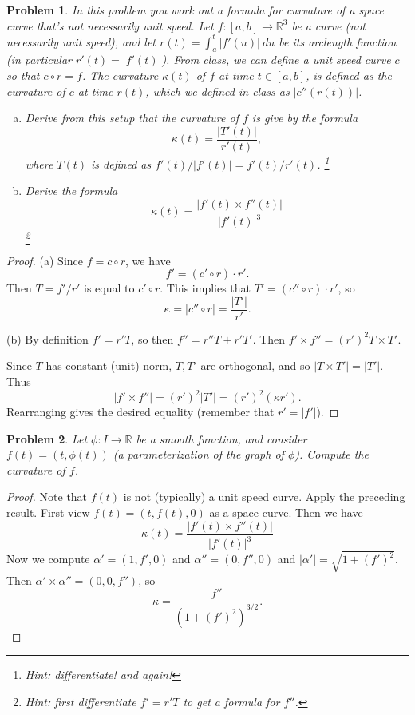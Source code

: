 \documentclass[11pt]{article}
\newtheorem{problem}{Problem}
\begin{document}
\pagebreak

\begin{problem}
In this problem you work out a formula for curvature of a space curve that's not necessarily unit speed. Let $f:[a,b]\to\mathbb R^3$ be a curve (not necessarily unit speed), and let $r(t)=\int_a^t|f'(u)|\>du$ be its arclength function (in particular $r'(t)=|f'(t)|$). From class, we can define a unit speed curve $c$ so that $c\circ r=f$. The curvature $\kappa(t)$ of $f$ at time $t\in[a,b]$, is defined as the curvature of $c$ at time $r(t)$, which we defined in class as $|c''(r(t))|$.  
\begin{enumerate}[(a)]
\item Derive from this setup that the curvature of $f$ is give by the formula
\[\kappa(t)=\frac{|T'(t)|}{r'(t)},\]
where $T(t)$ is defined as $f'(t)/|f'(t)|= f'(t)/r'(t)$. \footnote{Hint: differentiate! and again! }
\item Derive the formula 
\[\kappa(t)=\frac{|f'(t)\times f''(t)|}{|f'(t)|^3}
\]\footnote{Hint: first differentiate $f'=r'T$ to get a formula for $f''$.}
\end{enumerate} 
\end{problem}

\begin{proof}
(a) Since $f=c\circ r$, we have 
\[f'=(c'\circ r)\cdot r'.\]
Then $T=f'/r'$ is equal to $c'\circ r$. This implies that $T'=(c''\circ r)\cdot r'$, so 
\[\kappa=|c''\circ r|=\frac{|T'|}{r'}.\]

(b) By definition $f'=r'T$, so then $f''=r''T+r'T'$. Then $f'\times f''=(r')^2T\times T'$. 

Since $T$ has constant (unit) norm, $T,T'$ are orthogonal, and so $|T\times T'|=|T'|$. Thus
\[|f'\times f''|=(r')^2|T'|=(r')^2(\kappa r').\]
Rearranging gives the desired equality (remember that $r'=|f'|$). 
\end{proof}

\pagebreak

\begin{problem}
Let $\phi:I\to\mathbb R$ be a smooth function, and consider $f(t)=(t,\phi(t))$ (a parameterization of the graph of $\phi$). Compute the curvature of $f$. 
\end{problem}

\begin{proof}
Note that $f(t)$ is not (typically) a unit speed curve. Apply the preceding result. First view $f(t)=(t,f(t),0)$ as a space curve. Then we have
\[\kappa(t)=\frac{|f'(t)\times f''(t)|}{|f'(t)|^3}\]
Now we compute $\alpha'=(1,f',0)$ and  $\alpha''=(0,f'',0)$ and $|\alpha'|=\sqrt{1+(f')^2}$. Then $\alpha'\times\alpha''=(0,0,f'')$, so 
\[\kappa=\frac{f''}{(1+(f')^2)^{3/2}}.\]
\end{proof}
\end{document}
